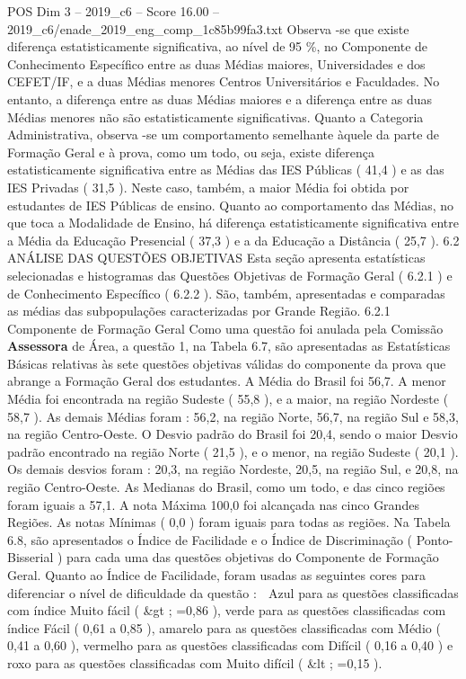 \begin{textsample}{POS Dim 3 – 2019\_c6 – Score 16.00 – 2019\_c6/enade\_2019\_eng\_comp\_1c85b99fa3.txt}
Observa -se que existe diferença estatisticamente significativa, ao nível de 95 \%, no Componente de Conhecimento Específico entre as duas Médias maiores, Universidades e dos CEFET/IF, e a duas Médias menores Centros Universitários e Faculdades.
No entanto, a diferença entre as duas Médias maiores e a diferença entre as duas Médias menores não são estatisticamente significativas.
Quanto a Categoria Administrativa, observa -se um comportamento semelhante àquele da parte de Formação Geral e à prova, como um todo, ou seja, existe diferença estatisticamente significativa entre as Médias das IES Públicas ( 41,4 ) e as das IES Privadas ( 31,5 ).
Neste caso, também, a maior Média foi obtida por estudantes de IES Públicas de ensino.
Quanto ao comportamento das Médias, no que toca a Modalidade de Ensino, há diferença estatisticamente significativa entre a Média da Educação Presencial ( 37,3 ) e a da Educação a Distância ( 25,7 ). 6.2 ANÁLISE DAS QUESTÕES OBJETIVAS Esta seção apresenta estatísticas selecionadas e histogramas das Questões Objetivas de Formação Geral ( 6.2.1 ) e de Conhecimento Específico ( 6.2.2 ).
São, também, apresentadas e comparadas as médias das subpopulações caracterizadas por Grande Região. 6.2.1 Componente de Formação Geral Como uma questão foi anulada pela Comissão \textbf{Assessora} de Área, a questão 1, na Tabela 6.7, são apresentadas as Estatísticas Básicas relativas às sete questões objetivas válidas do componente da prova que abrange a Formação Geral dos estudantes.
A Média do Brasil foi 56,7.
A menor Média foi encontrada na região Sudeste ( 55,8 ), e a maior, na região Nordeste ( 58,7 ).
As demais Médias foram : 56,2, na região Norte, 56,7, na região Sul e 58,3, na região Centro-Oeste.
O Desvio padrão do Brasil foi 20,4, sendo o maior Desvio padrão encontrado na região Norte ( 21,5 ), e o menor, na região Sudeste ( 20,1 ).
Os demais desvios foram : 20,3, na região Nordeste, 20,5, na região Sul, e 20,8, na região Centro-Oeste.
As Medianas do Brasil, como um todo, e das cinco regiões foram iguais a 57,1.
A nota Máxima 100,0 foi alcançada nas cinco Grandes Regiões.
As notas Mínimas ( 0,0 ) foram iguais para todas as regiões.
Na Tabela 6.8, são apresentados o Índice de Facilidade e o Índice de Discriminação ( Ponto-Bisserial ) para cada uma das questões objetivas do Componente de Formação Geral.
Quanto ao Índice de Facilidade, foram usadas as seguintes cores para diferenciar o nível de dificuldade da questão :  Azul para as questões classificadas com índice Muito fácil ( \&gt ; =0,86 ), verde para as questões classificadas com índice Fácil ( 0,61 a 0,85 ), amarelo para as questões classificadas com Médio ( 0,41 a 0,60 ), vermelho para as questões classificadas com Difícil ( 0,16 a 0,40 ) e roxo para as questões classificadas com Muito difícil ( \&lt ; =0,15 ).

\end{textsample}
